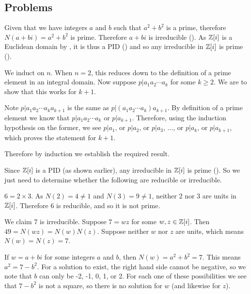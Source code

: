 \subsection*{Problems}
\begin{questions}
    \item Given that we have integers $a$ and $b$ such that $a^2 + b^2$ is a prime, therefore $N(a+bi) = a^2+b^2$ is prime. Therefore $a+bi$ is irreducible (). As $\mathbb{Z}[i]$ is a Euclidean domain by , it is thus a PID () and so any irreducible in $\mathbb{Z}[i]$ is prime ().

    \item We induct on $n$. When $n = 2$, this reduces down to the definition of a prime element in an integral domain. Now suppose $p \vert a_1a_2\cdots a_k$ for some $k \geq 2$. We are to show that this works for $k + 1$.

    Note $p \vert a_1a_2\cdots a_ka_{k+1}$ is the same as $p \vert (a_1a_2\cdots a_k)a_{k+1}$. By definition of a prime element we know that $p \vert a_1a_2\cdots a_k$ or $p \vert a_{k+1}$. Therefore, using the induction hypothesis on the former, we see $p\vert a_1$, or $p\vert a_2$, or $p \vert a_3$, ..., or $p \vert a_k$, or $p \vert a_{k+1}$, which proves the statement for $k + 1$.

    Therefore by induction we establish the required result.

    \item Since $\mathbb{Z}[i]$ is a PID (as shown earlier), any irreducible in $\mathbb{Z}[i]$ is prime (). So we just need to determine whether the following are reducible or irreducible.
    \begin{partquestions}{\alph*}
        \item $6 = 2 \times 3$. As $N(2) = 4 \neq 1$ and $N(3) = 9 \neq 1$, neither 2 nor 3 are units in $\mathbb{Z}[i]$. Therefore 6 is reducible, and so it is not prime.

        \item We claim 7 is irreducible. Suppose $7 = wz$ for some $w,z \in \mathbb{Z}[i]$. Then $49 = N(wz) = N(w)N(z)$. Suppose neither $w$ nor $z$ are units, which means $N(w) = N(z) = 7$.

        If $w = a+bi$ for some integers $a$ and $b$, then $N(w) = a^2+b^2 = 7$. This means $a^2 = 7 - b^2$. For a solution to exist, the right hand side cannot be negative, so we note that $b$ can only be -2, -1, 0, 1, or 2. For each one of these possibilities we see that $7 - b^2$ is not a square, so there is no solution for $w$ (and likewise for $z$).


\end{partquestions}
\end{questions}
